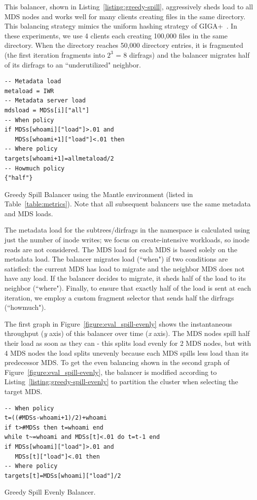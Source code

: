 This balancer, shown in Listing~\ref{listing:greedy-spill}, aggressively sheds load to all MDS nodes and works well for many clients creating files in the same directory. This balancing strategy mimics the uniform hashing strategy of GIGA+~\cite{patil:fast2011-giga+, ren:sc2014-indexfs}. In these experiments, we use 4 clients each creating 100,000 files in the same directory. When the directory reaches 50,000 directory entries, it is fragmented (the first iteration fragments into \(2^{3}\) = 8 dirfrags) and the balancer migrates half of its dirfrags to an ``underutilized" neighbor. 

\begin{listing}
	\ssp
	\begin{verbatim}
-- Metadata load
metaload = IWR
-- Metadata server load
mdsload = MDSs[i]["all"]
-- When policy
if MDSs[whoami]["load"]>.01 and 
   MDSs[whoami+1]["load"]<.01 then
-- Where policy
targets[whoami+1]=allmetaload/2
-- Howmuch policy
{"half"}
	\end{verbatim}
	\dsp
    \caption{Greedy Spill Balancer using the Mantle environment (listed in Table~\ref{table:metrics}). Note that all subsequent balancers use the same metadata and MDS loads.\label{listing:greedy-spill}}
\end{listing}

The metadata load for the subtrees/dirfrags in the namespace is calculated using just the number of inode writes; we focus on create-intensive workloads, so inode reads are not considered. The MDS load for each MDS is based solely on the metadata load. The balancer migrates load (``when") if two conditions are satisfied: the current MDS has load to migrate and the neighbor MDS does not have any load. If the balancer decides to migrate, it sheds half of the load to its neighbor (``where"). Finally, to ensure that exactly half of the load is sent at each iteration, we employ a custom fragment selector that sends half the dirfrags (``howmuch"). 

The first graph in Figure~\ref{figure:eval_spill-evenly} shows the instantaneous throughput ({\it y} axis) of this balancer over time ({\it x} axis). The MDS nodes spill half their load as soon as they can - this splits load evenly for 2 MDS nodes, but with 4 MDS nodes the load splits unevenly because each MDS spills less load than its predecessor MDS. To get the even balancing shown in the second graph of Figure~\ref{figure:eval_spill-evenly}, the balancer is modified according to Listing~\ref{listing:greedy-spill-evenly} to partition the cluster when selecting the target MDS.
\begin{listing}
	\ssp
	\begin{verbatim}
-- When policy
t=((#MDSs-whoami+1)/2)+whoami
if t>#MDSs then t=whoami end
while t~=whoami and MDSs[t]<.01 do t=t-1 end
if MDSs[whoami]["load"]>.01 and        
   MDSs[t]["load"]<.01 then
-- Where policy
targets[t]=MDSs[whoami]["load"]/2
	\end{verbatim}
	\dsp
    \caption{Greedy Spill Evenly Balancer.\label{listing:greedy-spill-evenly}}
\end{listing}

